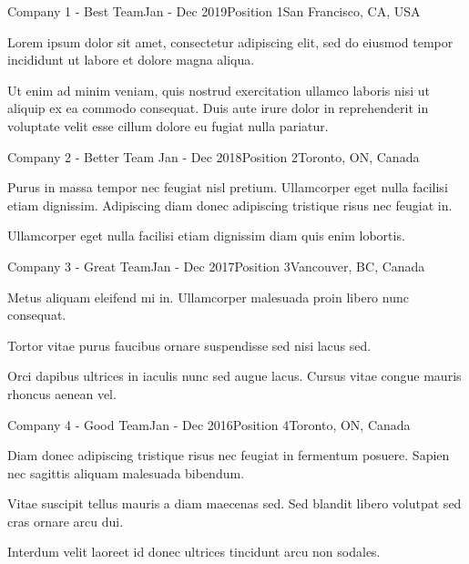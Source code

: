 \documentclass{custom}
\begin{document}
\begin{rSection}
	\begin{rSubsection}{Company 1 \NivLig \color{black} - Best Team}{Jan - Dec 2019}{Position 1}{San Francisco, CA, USA} 
    	   	\item Lorem ipsum dolor sit amet, consectetur adipiscing elit, sed do eiusmod tempor incididunt ut labore et dolore magna aliqua.
   	   	    \item Ut enim ad minim veniam, quis nostrud exercitation ullamco laboris nisi ut aliquip ex ea commodo consequat. Duis aute irure dolor in reprehenderit in voluptate velit esse cillum dolore eu fugiat nulla pariatur.
	\end{rSubsection}
	
	\begin{rSubsection}{Company 2 \NivLig \color{black} - Better Team}{ Jan - Dec 2018}{Position 2}{Toronto, ON, Canada}
    		\item Purus in massa tempor nec feugiat nisl pretium. Ullamcorper eget nulla facilisi etiam dignissim. Adipiscing diam donec adipiscing tristique risus nec feugiat in.
	        \item Ullamcorper eget nulla facilisi etiam dignissim diam quis enim lobortis. 
	        
	\end{rSubsection}
	\begin{rSubsection}{Company 3 \NivLig \color{black} - Great Team}{Jan - Dec 2017}{Position 3}{Vancouver, BC, Canada} 
    	   	\item Metus aliquam eleifend mi in. Ullamcorper malesuada proin libero nunc consequat.
    	   	\item Tortor vitae purus faucibus ornare suspendisse sed nisi lacus sed. 
    	   	\item Orci dapibus ultrices in iaculis nunc sed augue lacus. Cursus vitae congue mauris rhoncus aenean vel.
	\end{rSubsection}
	
	\begin{rSubsection}{Company 4 \NivLig \color{black} - Good Team}{Jan - Dec 2016}{Position 4}{Toronto, ON, Canada} 
    		\item Diam donec adipiscing tristique risus nec feugiat in fermentum posuere. Sapien nec sagittis aliquam malesuada bibendum.
    		\item Vitae suscipit tellus mauris a diam maecenas sed. Sed blandit libero volutpat sed cras ornare arcu dui. 
    		\item Interdum velit laoreet id donec ultrices tincidunt arcu non sodales. 
	\end{rSubsection}
\end{rSection}
\end{document}
